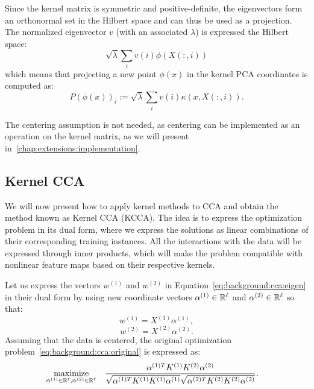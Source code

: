 Since the kernel matrix is symmetric and positive-definite, the eigenvectors form an orthonormal set in the Hilbert space and
can thus be used as a projection. The normalized eigenvector $v$ (with an associated $\lambda$) is expressed the Hilbert space:
$$ \sqrt{\lambda} \sum_i v(i) \phi(X(:,i))$$
which means that projecting a new point $\phi(x)$ in the kernel PCA coordinates is computed as:
$$P(\phi(x))_i := \sqrt{\lambda} \sum_i v(i) \kappa(x, X(:,i)).$$

The centering assumption is not needed, as centering can be implemented as an operation on the kernel matrix, as we will
present in~\ref{chap:extensions:implementation}.

\subsection{Kernel CCA}

We will now present how to apply kernel methods to CCA and obtain the method known as Kernel CCA (KCCA).
The idea is to express the optimization problem in its dual form, where we express the solutions as
linear combinations of their corresponding training instances. All the interactions with the data
will be expressed through inner products, which will make the problem compatible with nonlinear feature
maps based on their respective kernels.

Let us express the vectors $w^{(1)}$ and $w^{(2)}$ in Equation~\ref{eq:background:cca:eigen} in their
dual form by using new coordinate vectors $\alpha^{(1)} \in \mathbb{R}^\ell$ and $\alpha^{(2)} \in \mathbb{R}^\ell$
so that:
$$w^{(1)} = X^{(1)} \alpha^{(1)},$$
$$w^{(2)} = X^{(2)} \alpha^{(2)}.$$
Assuming that the data is centered, the original optimization problem~\ref{eq:background:cca:original}
is expressed as:
\begin{equation}\label{eq:background:cca:original}
\begin{aligned}
& \underset{\alpha^{(1)} \in \mathbb{R}^{\ell}, \alpha^{(2)} \in \mathbb{R}^{\ell}}{\text{maximize}}
& & \frac{\alpha^{(1)T} K^{(1)} K^{(2)} \alpha^{(2)}}{\sqrt{\alpha^{(1)T} K^{(1)}K^{(1)} \alpha^{(1)}} \sqrt{\alpha^{(2)T} K^{(2)}K^{(2)} \alpha^{(2)}}}.
\end{aligned}
\end{equation}

